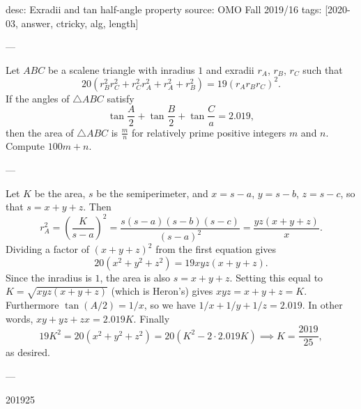 desc: Exradii and tan half-angle property
source: OMO Fall 2019/16
tags: [2020-03, answer, ctricky, alg, length]

---

Let $ABC$ be a scalene triangle with inradius $1$ and exradii $r_A$, $r_B$, $r_C$ such that \[20\left(r_B^2r_C^2+r_C^2r_A^2+r_A^2+r_B^2\right)=19(r_Ar_Br_C)^2.\]
If the angles of $\triangle ABC$ satisfy \[\tan\frac A2+\tan\frac B2+\tan\frac Ca=2.019,\]
then the area of $\triangle ABC$ is $\tfrac mn$ for relatively prime positive integers $m$ and $n$. Compute $100m+n$.

---

Let $K$ be the area, $s$ be the semiperimeter, and $x=s-a$, $y=s-b$, $z=s-c$, so that $s=x+y+z$. Then \[r_A^2=\left(\frac K{s-a}\right)^2=\frac{s(s-a)(s-b)(s-c)}{(s-a)^2}=\frac{yz(x+y+z)}x.\]
Dividing a factor of $(x+y+z)^2$ from the first equation gives \[20(x^2+y^2+z^2)=19xyz(x+y+z).\]
Since the inradius is $1$, the area is also $s=x+y+z$. Setting this equal to $K=\sqrt{xyz(x+y+z)}$ (which is Heron's) gives $xyz=x+y+z=K$. Furthermore $\tan(A/2)=1/x$, so we have $1/x+1/y+1/z=2.019$. In other words, $xy+yz+zx=2.019K$. Finally \[19K^2=20(x^2+y^2+z^2)=20(K^2-2\cdot 2.019K)\implies K=\frac{2019}{25},\]
as desired.

---

201925
